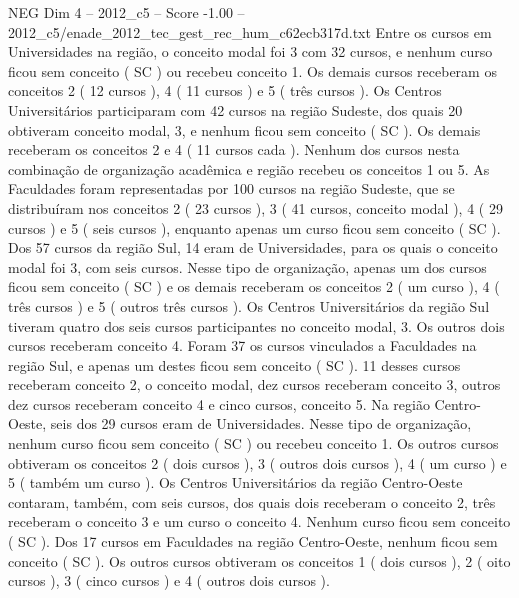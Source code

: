 \begin{textsample}{NEG Dim 4 – 2012\_c5 – Score -1.00 – 2012\_c5/enade\_2012\_tec\_gest\_rec\_hum\_c62ecb317d.txt}
Entre os cursos em Universidades na região, o conceito modal foi 3 com 32 cursos, e nenhum curso ficou sem conceito ( SC ) ou recebeu conceito 1.
Os demais cursos receberam os conceitos 2 ( 12 cursos ), 4 ( 11 cursos ) e 5 ( três cursos ).
Os Centros Universitários participaram com 42 cursos na região Sudeste, dos quais 20 obtiveram conceito modal, 3, e nenhum ficou sem conceito ( SC ).
Os demais receberam os conceitos 2 e 4 ( 11 cursos cada ).
Nenhum dos cursos nesta combinação de organização acadêmica e região recebeu os conceitos 1 ou 5.
As Faculdades foram representadas por 100 cursos na região Sudeste, que se distribuíram nos conceitos 2 ( 23 cursos ), 3 ( 41 cursos, conceito modal ), 4 ( 29 cursos ) e 5 ( seis cursos ), enquanto apenas um curso ficou sem conceito ( SC ).
Dos 57 cursos da região Sul, 14 eram de Universidades, para os quais o conceito modal foi 3, com seis cursos.
Nesse tipo de organização, apenas um dos cursos ficou sem conceito ( SC ) e os demais receberam os conceitos 2 ( um curso ), 4 ( três cursos ) e 5 ( outros três cursos ).
Os Centros Universitários da região Sul tiveram quatro dos seis cursos participantes no conceito modal, 3.
Os outros dois cursos receberam conceito 4.
Foram 37 os cursos vinculados a Faculdades na região Sul, e apenas um destes ficou sem conceito ( SC ). 11 desses cursos receberam conceito 2, o conceito modal, dez cursos receberam conceito 3, outros dez cursos receberam conceito 4 e cinco cursos, conceito 5.
Na região Centro-Oeste, seis dos 29 cursos eram de Universidades.
Nesse tipo de organização, nenhum curso ficou sem conceito ( SC ) ou recebeu conceito 1.
Os outros cursos obtiveram os conceitos 2 ( dois cursos ), 3 ( outros dois cursos ), 4 ( um curso ) e 5 ( também um curso ).
Os Centros Universitários da região Centro-Oeste contaram, também, com seis cursos, dos quais dois receberam o conceito 2, três receberam o conceito 3 e um curso o conceito 4.
Nenhum curso ficou sem conceito ( SC ).
Dos 17 cursos em Faculdades na região Centro-Oeste, nenhum ficou sem conceito ( SC ).
Os outros cursos obtiveram os conceitos 1 ( dois cursos ), 2 ( oito cursos ), 3 ( cinco cursos ) e 4 ( outros dois cursos ).

\end{textsample}
